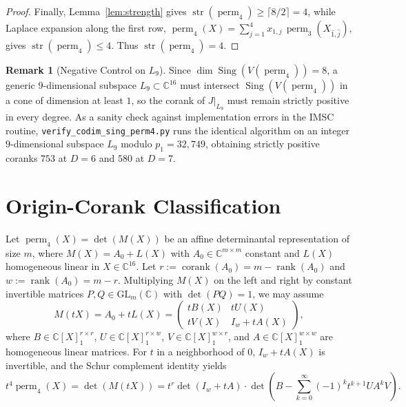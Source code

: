 \documentclass[11pt,a4paper]{article}
\theoremstyle{definition}
\newtheorem{remark}[theorem]{Remark}
\DeclareMathOperator{\perm}{perm}
\DeclareMathOperator{\Sing}{Sing}
\DeclareMathOperator{\rank}{rank}
\DeclareMathOperator{\corank}{corank}
\DeclareMathOperator{\str}{str}
\begin{document}
\begin{proof}
Finally, Lemma~\ref{lem:strength} gives $\str(\perm_4) \ge \lceil 8/2 \rceil = 4$, while Laplace expansion along the first row, $\perm_4(X) = \sum_{j=1}^4 x_{1,j}\,\perm_3(X_{\hat{1},\hat{j}})$, gives $\str(\perm_4) \le 4$. Thus $\str(\perm_4) = 4$.
\end{proof}

\begin{remark}[Negative Control on $L_9$]
Since $\dim \Sing(V(\perm_4)) = 8$, a generic $9$-dimensional subspace $L_9 \subset \mathbb{C}^{16}$ must intersect $\Sing(V(\perm_4))$ in a cone of dimension at least $1$, so the corank of $J|_{L_9}$ must remain strictly positive in every degree. As a sanity check against implementation errors in the IMSC routine, \texttt{verify\_codim\_sing\_perm4.py} runs the identical algorithm on an integer $9$-dimensional subspace $L_9$ modulo $p_1 = 32{,}749$, obtaining strictly positive coranks $753$ at $D = 6$ and $580$ at $D = 7$.
\end{remark}

\section{Origin-Corank Classification}\label{sec:corank}

Let $\perm_4(X) = \det(M(X))$ be an affine determinantal representation of size $m$, where $M(X) = A_0 + L(X)$ with $A_0 \in \mathbb{C}^{m\times m}$ constant and $L(X)$ homogeneous linear in $X \in \mathbb{C}^{16}$. Let $r := \corank(A_0) = m - \rank(A_0)$ and $w := \rank(A_0) = m - r$. Multiplying $M(X)$ on the left and right by constant invertible matrices $P, Q \in \mathrm{GL}_m(\mathbb{C})$ with $\det(PQ) = 1$, we may assume
\begin{equation}\label{eq:blockM}
  M(tX) = A_0 + tL(X) = \begin{pmatrix} t B(X) & t U(X) \\ t V(X) & I_w + t A(X) \end{pmatrix},
\end{equation}
where $B \in \mathbb{C}[X]_1^{r\times r}$, $U \in \mathbb{C}[X]_1^{r\times w}$, $V \in \mathbb{C}[X]_1^{w\times r}$, and $A \in \mathbb{C}[X]_1^{w\times w}$ are homogeneous linear matrices. For $t$ in a neighborhood of $0$, $I_w + tA(X)$ is invertible, and the Schur complement identity yields
\begin{equation}\label{eq:schur}
  t^4 \perm_4(X) = \det(M(tX))
  = t^r \det(I_w + tA) \cdot \det\!\left(B - \sum_{k=0}^{\infty} (-1)^k t^{k+1} U A^k V\right).
\end{equation}
\end{document}
